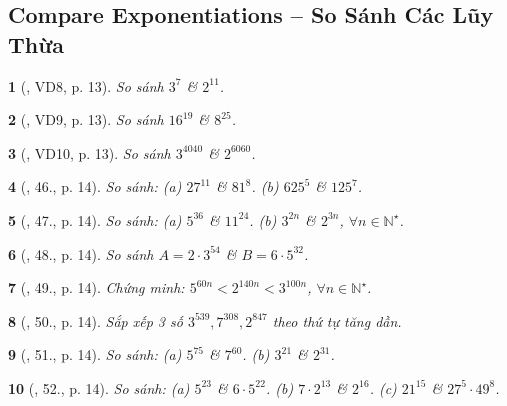 \documentclass{article}
\newtheorem{baitoan}{}
\begin{document}

\subsection{Compare Exponentiations -- So Sánh Các Lũy Thừa}

\begin{baitoan}[\cite{Tuyen_Toan_6}, VD8, p. 13]
	So sánh $3^7$ \& $2^{11}$.
\end{baitoan}

\begin{baitoan}[\cite{Tuyen_Toan_6}, VD9, p. 13]
	So sánh $16^{19}$ \& $8^{25}$.
\end{baitoan}

\begin{baitoan}[\cite{Tuyen_Toan_6}, VD10, p. 13]
	So sánh $3^{4040}$ \& $2^{6060}$.
\end{baitoan}

\begin{baitoan}[\cite{Tuyen_Toan_6}, 46., p. 14]
	So sánh: (a) $27^{11}$ \& $81^8$. (b) $625^5$ \& $125^7$.
\end{baitoan}

\begin{baitoan}[\cite{Tuyen_Toan_6}, 47., p. 14]
	So sánh: (a) $5^{36}$ \& $11^{24}$. (b) $3^{2n}$ \& $2^{3n}$, $\forall n\in\mathbb{N}^\star$.
\end{baitoan}

\begin{baitoan}[\cite{Tuyen_Toan_6}, 48., p. 14]
	So sánh $A = 2\cdot3^{54}$ \& $B = 6\cdot5^{32}$.
\end{baitoan}

\begin{baitoan}[\cite{Tuyen_Toan_6}, 49., p. 14]
	Chứng minh: $5^{60n} < 2^{140n} < 3^{100n}$, $\forall n\in\mathbb{N}^\star$.
\end{baitoan}

\begin{baitoan}[\cite{Tuyen_Toan_6}, 50., p. 14]
	Sắp xếp 3 số $3^{539},7^{308},2^{847}$ theo thứ tự tăng dần.
\end{baitoan}

\begin{baitoan}[\cite{Tuyen_Toan_6}, 51., p. 14]
	So sánh: (a) $5^{75}$ \& $7^{60}$. (b) $3^{21}$ \& $2^{31}$.
\end{baitoan}

\begin{baitoan}[\cite{Tuyen_Toan_6}, 52., p. 14]
	So sánh: (a) $5^{23}$ \& $6\cdot5^{22}$. (b) $7\cdot2^{13}$ \& $2^{16}$. (c) $21^{15}$ \& $27^5\cdot49^8$.
\end{baitoan}
\end{document}
